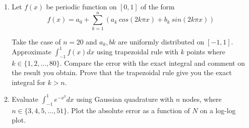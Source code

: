 \documentclass{article}
\begin{document}
\begin{enumerate}
\item Let $f(x)$ be periodic function on $[0,1]$ of the form 
\begin{equation*}
f(x) = a_{0} + \sum_{k=1}^{n} (a_{k}\ cos(2k\pi x) + b_{k}\ sin(2k\pi x))
\end{equation*}

Take the case of $n = 20$ and $a_{k}, b{k}$ are uniformly distributed on $[-1,1]$.
Approximate $\displaystyle \int_{-1}^{1} f(x) dx$ using trapezoidal rule with $k$ points where $k \in
\{1,2,...,80\}$. Compare the error with the exact integral and comment on the result you
obtain. Prove that the trapezoidal rule give you the exact integral for $k > n$.

\item Evaluate $\displaystyle \int_{-1}^{1} e^{-x^{2}} dx$ using Gaussian quadrature with $n$ nodes,
where $n \in \{3,4,5,...,51\}$. Plot the absolute error as a function of $N$ on a log-log
plot.

\end{enumerate}
\end{document}
